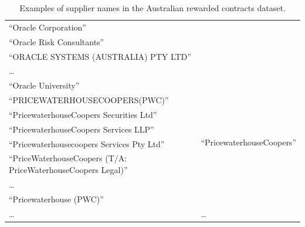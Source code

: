 \documentclass{llncs}
\begin{document}
\begin{table}[!htb]
\begin{center}
\begin{tabular}{|p{7cm}|p{7cm}|}
  ``Oracle Corporation'' & \\
  ``Oracle Risk Consultants'' & \\
  ``ORACLE SYSTEMS (AUSTRALIA) PTY LTD'' & \\
  \ldots  & \\
  ``Oracle University''  & \\ \hline
  ``PRICEWATERHOUSECOOPERS(PWC)''  & \multirow{6}{*}{``PricewaterhouseCoopers''} \\
  ``PricewaterhouseCoopers Securities Ltd''& \multirow{6}{*}{\scriptsize\url{http://dbpedia.org/resource/PricewaterhouseCoopers}} \\
  ``PricewaterhouseCoopers Services LLP'' & \\
  ``Pricewaterhousecoopers Services Pty Ltd'' & \\
  ``PriceWaterhouseCoopers (T/A: PriceWaterhouseCoopers Legal)'' & \\
  \ldots  & \\
  ``Pricewaterhouse (PWC)'' & \\ \hline
  \ldots & \ldots \\
  \hline
  \end{tabular}
  \caption{Examples of supplier names in the Australian rewarded contracts dataset.}
  \label{tabla:aus-suppliers}
  \end{center}
\end{table} 
\end{document}
